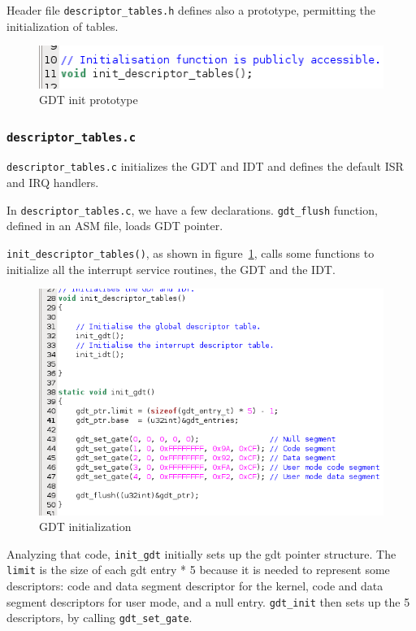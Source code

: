 \documentclass{report}
\begin{document}
Header file \texttt{descriptor\_tables.h} defines also a prototype, permitting the initialization of tables.

\begin{figure}[hbtp]
\centering
\includegraphics[scale=0.4]{images/es02/gdt_init.png}
\caption{GDT init prototype}
\end{figure}

\subsubsection*{\texttt{descriptor\_tables.c}}
\texttt{descriptor\_tables.c} initializes the GDT and IDT and defines the default ISR and IRQ handlers.

In \texttt{descriptor\_tables.c}, we have a few declarations. \texttt{gdt\_flush} function, defined in an ASM file, loads GDT pointer. 

\texttt{init\_descriptor\_tables()}, as shown in figure~\ref{descriptor_tables_init}, calls some functions to initialize all the interrupt service routines, the GDT and the IDT.

\begin{figure}[hbtp]
\centering
\includegraphics[scale=0.4]{images/es02/descriptor_tables_init.png}
\caption{GDT initialization}
\label{descriptor_tables_init}
\end{figure}

Analyzing that code, \texttt{init\_gdt} initially sets up the gdt pointer structure. The \texttt{limit} is the size of each gdt entry * 5 because it is needed to represent some descriptors: code and data segment descriptor for the kernel, code and data segment descriptors for user mode, and a null entry. \texttt{gdt\_init} then sets up the 5 descriptors, by calling \texttt{gdt\_set\_gate}.
\end{document}

